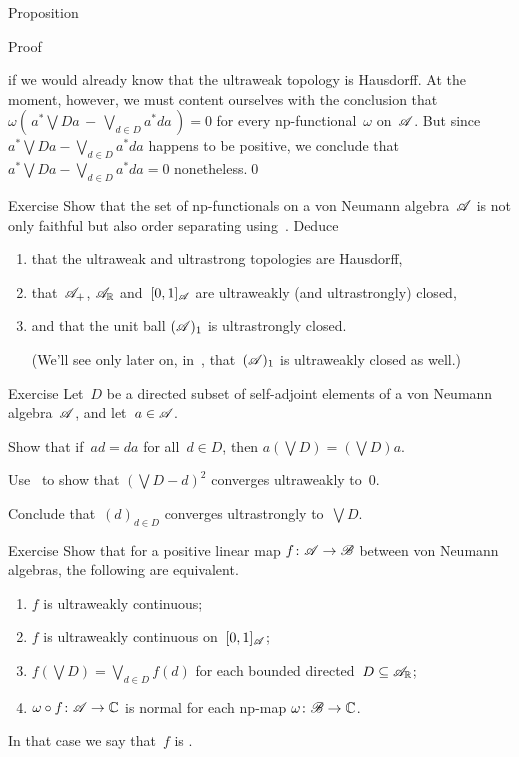 \documentclass[a]{subfiles}
\begin{document}
\begin{parsec}
\begin{point}[ad-normal]{Proposition}
\begin{point}[ad-normal-1]{Proof}
\begin{point}
if we would already know that the ultraweak topology is Hausdorff.
At the moment, however,
we must content ourselves with
the conclusion that
$\omega(\,a^*\bigvee D a\,-\, \bigvee_{d\in D} a^* d a\,)=0$
for every np-functional~$\omega$ on~$\mathscr{A}$.
But since
$a^*\bigvee D a - 
\bigvee_{d\in D} a^* da$
happens to be positive,
we conclude that
$a^*\bigvee D a  
- \bigvee_{d\in D} a^* d a =0$
nonetheless.\qed
\end{point}
\end{point}
\end{point}
\begin{point}{Exercise}%
Show that the set of np-functionals
on a von Neumann algebra~$\mathscr{A}$
is not only faithful 
but also order separating
using~.
Deduce
\begin{enumerate}%
\item
that the ultraweak and ultrastrong topologies
are Hausdorff,
\item
that~$\mathscr{A}_+$, 
$\mathscr{A}_{\mathbb{R}}$ and~$[0,1]_{\mathscr{A}}$  are ultraweakly 
(and ultrastrongly) closed, 
\item
and that the unit ball
$(\mathscr{A})_1$
is ultrastrongly closed.

(We'll see only later on, in~,
that~$(\mathscr{A})_1$
is ultraweakly closed as well.)
\end{enumerate}
\end{point}
\begin{point}{Exercise}%
Let~$D$ be a directed subset of self-adjoint elements
of a von Neumann algebra~$\mathscr{A}$,
and let~$a\in\mathscr{A}$.
\begin{point}%
Show that if~$ad=da$ for all~$d\in D$,
then $a(\bigvee D) = (\bigvee D)a $.
\end{point}
\begin{point}%
Use~
to show that $(\bigvee D-d)^2$ converges ultraweakly to~$0$.

Conclude that~$(d)_{d\in D}$ converges ultrastrongly to~$\bigvee D$.
\end{point}
\end{point}
\begin{point}[p-uwcont]{Exercise}%
Show that for a positive linear map $f\colon \mathscr{A}\to\mathscr{B}$
between von Neumann algebras,
the following are equivalent.
\begin{enumerate}
\item
$f$ is ultraweakly continuous;
\item
$f$ is ultraweakly continuous on~$[0,1]_{\mathscr{A}}$;
\item
$f(\bigvee D)=\bigvee_{d\in D}f(d)$ for each bounded 
directed~$D\subseteq\mathscr{A}_{\mathbb{R}}$;
\item 
$\omega\circ f\colon \mathscr{A}\to\mathbb{C}$ is normal 
for each np-map $\omega\colon \mathscr{B}\to\mathbb{C}$.
\end{enumerate}
In that case we say that~$f$ is .


\end{point}
\end{parsec}
\end{document}
